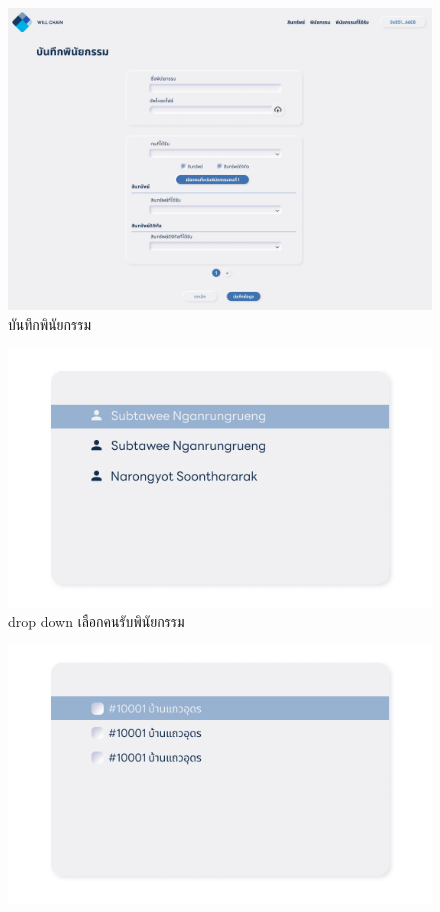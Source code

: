\documentclass[12pt,oneside,openright,a4paper]{cpe-thai-project}
\begin{document}
\begin{enumerate}[label=\thesubsection.\arabic*,leftmargin=0pt,itemindent=2.5cm]
\begin{figure}[!thb]
			\includegraphics[scale=0.25]{saveWillReal}
			\caption{บันทึกพินัยกรรม}
		\end{figure}
		\FloatBarrier
		\begin{figure}[!thb]
			\centering
			\includegraphics[scale=0.25]{dropdown1}
			\caption{drop down เลือกคนรับพินัยกรรม}
		\end{figure}
		\FloatBarrier
		\begin{figure}[!thb]
			\centering
			\includegraphics[scale=0.25]{dropdown2}

\end{figure}
\end{enumerate}
\end{document}
